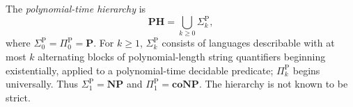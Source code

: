 
The \emph{polynomial-time hierarchy} is
\[
\mathbf{PH}=\bigcup_{k\ge0}\Sigma_k^{\mathrm P},
\]
where $\Sigma_0^{\mathrm P}=\Pi_0^{\mathrm P}=\mathbf P$. For $k\ge1$, $\Sigma_k^{\mathrm P}$ consists of languages describable with at most $k$ alternating blocks of polynomial-length string quantifiers beginning existentially, applied to a polynomial-time decidable predicate; $\Pi_k^{\mathrm P}$ begins universally. Thus $\Sigma_1^{\mathrm P}=\mathbf{NP}$ and $\Pi_1^{\mathrm P}=\mathbf{coNP}$. The hierarchy is not known to be strict.
